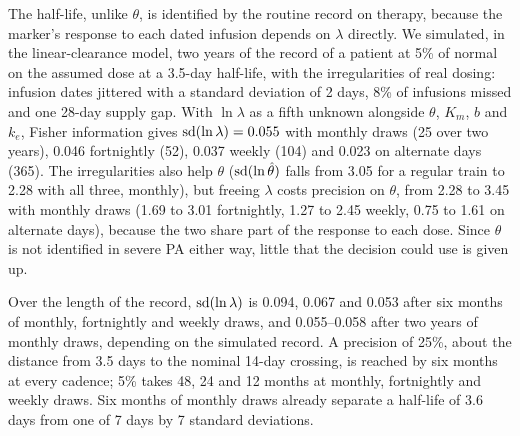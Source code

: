 The half-life, unlike $\theta$, is identified by the routine record on therapy, because the
marker's response to each dated infusion depends on $\lambda$ directly. We simulated, in the
linear-clearance model, two years of the record of a patient at 5\% of normal on the assumed dose
at a 3.5-day half-life, with the irregularities of real dosing: infusion dates
jittered with a standard deviation of 2 days, 8\% of infusions missed and one 28-day supply gap.
With $\ln\lambda$ as a fifth unknown alongside $\theta$, $K_m$, $b$ and $k_e$, Fisher information
gives $\operatorname{sd}(\ln \lambda)=0.055$ with monthly draws (25 over two years), 0.046 fortnightly (52), 0.037
weekly (104) and 0.023 on alternate days (365). The irregularities also help $\theta$
($\operatorname{sd}(\ln \hat\theta)$ falls from 3.05 for a regular train to 2.28 with all three, monthly), but
freeing $\lambda$ costs precision on $\theta$, from 2.28 to 3.45 with monthly draws (1.69 to 3.01
fortnightly, 1.27 to 2.45 weekly, 0.75 to 1.61 on alternate days), because the two share part of
the response to each dose. Since $\theta$ is not identified in severe PA either way, little that
the decision could use is given up.

Over the length of the record, $\operatorname{sd}(\ln \lambda)$ is 0.094, 0.067 and 0.053 after six months of
monthly, fortnightly and weekly draws, and 0.055--0.058 after two years of monthly draws,
depending on the simulated record. A precision of 25\%, about the distance from 3.5 days to the
nominal 14-day crossing, is reached by six months at every cadence; 5\% takes 48, 24 and 12
months at monthly, fortnightly and weekly draws. Six months of monthly draws already separate a
half-life of 3.6 days from one of 7 days by 7 standard deviations.

